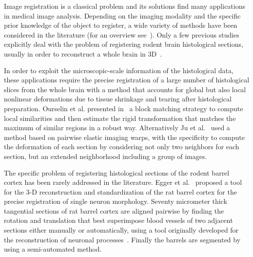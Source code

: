 Image registration is a classical problem and its solutions find many applications in medical image analysis. Depending on the imaging modality and the specific prior knowledge of the object to register, a wide variety of methods have been considered in the literature (for an overview see~\cite{GlockerAR,SotirasDP13}). 
%
Only a few previous studies explicitly deal with the problem of registering rodent brain histological sections, usually in order to reconstruct a whole brain in 3D~\cite{ourselin_2001,JuHisto}. 

In order to exploit the microscopic-scale information of the histological data, these applications require the precise registration of a large number of histological slices from the whole brain with a method that accounts for global but also local nonlinear deformations due to tissue shrinkage and tearing after histological preparation. Ourselin et al. presented in~\cite{ourselin_2001} a block matching strategy to compute local similarities and then estimate the rigid transformation that matches the maximum of similar regions in a robust way. Alternatively Ju et al.~\cite{JuHisto} used a method based on pairwise elastic imaging warps, with the specificity to compute the deformation of each section by considering not only two neighbors for each section, but an extended neighborhood including a group of images.

The specific problem of registering histological sections of the rodent barrel cortex has been rarely addressed in the literature. 
%
Egger et al.~\cite{egger_2012} proposed a tool for the 3-D reconstruction and standardization of the rat barrel cortex for the precise registration of single neuron morphology. 
%
Seventy micrometer thick tangential sections of rat barrel cortex are aligned pairwise by finding the rotation and translation that best superimpose blood vessels of two adjacent sections either manually or automatically, using a tool originally developed for the reconstruction of neuronal processes~\cite{DercksenAutomatic}.
% 
Finally the barrels are segmented by using a semi-automated method.
 


